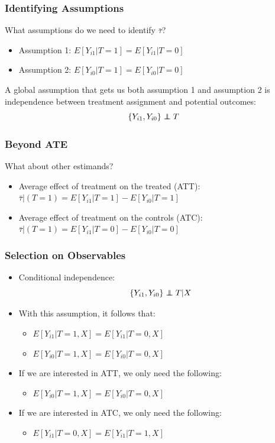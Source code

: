 \documentclass{beamer}
\newcommand\independent{\protect\mathpalette{\protect\independenT}{\perp}}
\def\independenT#1#2{\mathrel{\rlap{$#1#2$}\mkern2mu{#1#2}}}
\begin{document}
\begin{frame}[t]\frametitle{Identifying Assumptions}
	What assumptions do we need to identify $\bar \tau$?
	\begin{itemize}
		\item Assumption 1: $E[Y_{i1}|T=1] = E[Y_{i1}|T=0]$
		\item Assumption 2: $E[Y_{i0}|T=1] = E[Y_{i0}|T=0]$
	\end{itemize}
	A global assumption that gets us both assumption 1 and assumption 2 is independence between treatment assignment and potential outcomes:
	$$\{Y_{i1},Y_{i0}\}\independent T$$
\end{frame}

\begin{frame}[c]\frametitle{Beyond ATE}
	What about other estimands?
	\begin{itemize}
		\item<+-> Average effect of treatment on the treated (ATT): $\bar \tau|(T=1) = E[Y_{i1}|T=1] - E[Y_{i0}|T=1]$
		\item<+-> Average effect of treatment on the controls (ATC): $\bar \tau|(T=1) = E[Y_{i1}|T=0] - E[Y_{i0}|T=0]$		
	\end{itemize}
	\end{frame}

\begin{frame}[t]\frametitle{Selection on Observables}
	\begin{itemize}
		\item<+-> Conditional independence:
		$$\{Y_{i1},Y_{i0}\}\independent T|X$$
		\item<+-> With this assumption, it follows that:
		\begin{itemize}
			\item  $E[Y_{i1}|T=1,X] = E[Y_{i1}|T=0,X]$
			\item  $E[Y_{i0}|T=1,X] = E[Y_{i0}|T=0,X]$
		\end{itemize}
		\item<+-> If we are interested in ATT, we only need the following:
		\begin{itemize}
			\item  $E[Y_{i0}|T=1,X] = E[Y_{i0}|T=0,X]$
		\end{itemize}
		\item<+-> If we are interested in ATC, we only need the following:
		\begin{itemize}
			\item  $E[Y_{i1}|T=0,X] = E[Y_{i1}|T=1,X]$
		\end{itemize}
		
	\end{itemize}	
\end{frame}
\end{document}
